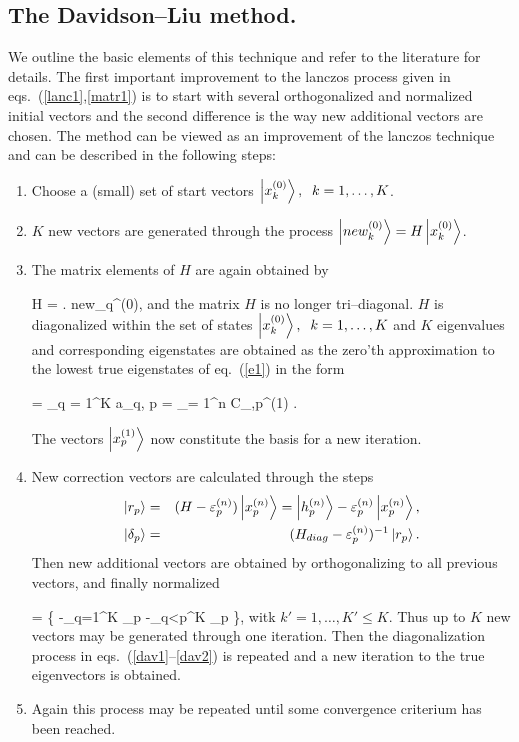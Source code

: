 \subsection{The Davidson--Liu method.}
%
We outline the basic elements of this technique and refer to
the literature\cite{dav89} for details.
The first important improvement to the lanczos process given in
eqs.~(\ref{lanc1},\ref{matr1}) is to start with
several orthogonalized  and normalized initial vectors
and the second difference is the  way new additional vectors
are chosen. The method can be viewed
as an improvement of the lanczos technique and can be described
in the following steps:
%
\begin{enumerate}
%
\item Choose a (small) set  of start vectors
$\left| x_k^{(0)} \right\rangle,\;\; k = 1,\ldots, K$.
%
\item $K$ new vectors are generated through the process
$\left| new_k^{(0)} \right\rangle = H \left| x_k^{(0)} \right\rangle$.
%
\item The matrix elements of $H$ are again obtained by

%
\be
{} H 
=  \left . new_q^{(0)}\right \rangle,
\label{dav1}
\ee
%
and the matrix $H$ is no longer tri--diagonal.
$H$ is diagonalized within the set of states
$\left| x_k^{(0)} \right\rangle,\;\; k = 1, \ldots, K$
and $K$ eigenvalues and corresponding eigenstates are obtained
as the zero'th approximation to the lowest true eigenstates
of eq.~(\ref{e1}) in the form
%

\be
{} = \sum_{q = 1}^{K} a_{q, p} 
                = \sum_{\nu = 1}^{n} C_{\nu,p}^{(1)} .
\label{dav2}
\ee

%
The vectors $\left| x_p^{(1)} \right\rangle$ now constitute the basis for a new iteration.
%
\item New correction vectors are calculated through the steps
%
%
\begin{eqnarray}
\left| r_p \right\rangle &=&(H - \varepsilon_p^{(n)}) \left| x_p^{(n)} \right\rangle
	 =\left| h_p^{(n)} \right\rangle - \varepsilon_p^{(n)} \left| x_p^{(n)} \right\rangle,
			                       \nonumber\\
\left| \delta_p \right\rangle &=& (H_{diag}-\varepsilon_p^{(n)})^{-1} \left| r_p \right\rangle.
\label{dav3}
\end{eqnarray}
%
Then new additional vectors are obtained by orthogonalizing
to all previous vectors, and finally normalized
%

\be
{}
	=  \{ 
		  -\sum_{q=1}^K  \cdot
	                     \delta_p \rangle 
  -\sum_{q<p}^K  \cdot {}
		                  \delta_p \rangle  \},
\ee
%
witk $k' = 1, \ldots, K' \leq K$. Thus up to $K$ new vectors
may be generated through one iteration.
Then the diagonalization process in eqs.~(\ref{dav1}--\ref{dav2}) is
repeated and a new iteration to the true eigenvectors is obtained.
%
\item Again this process may be repeated until some convergence
criterium has been reached.
%
\end{enumerate}
